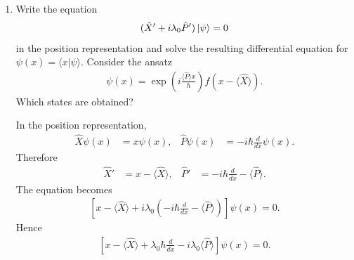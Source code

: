 \documentclass[11pt,a4paper]{scrartcl}
\begin{document}
\begin{enumerate}[label=(\alph*)]
    \item Write the equation
    \begin{align*}
        (\hat{X}' + i\lambda_0 \hat{P}')\ket{\psi} = 0
    \end{align*}
    in the position representation and solve the resulting differential equation for $\psi(x)=\langle x|\psi\rangle$. Consider the ansatz
    \begin{align*}
        \psi(x)=\exp\!\left(i\frac{\langle \hat{P}\rangle x}{\hbar}\right) f(x-\langle \hat{X}\rangle).
    \end{align*}
    Which states are obtained?
    \begin{calculationbox}
        In the position representation,
        \begin{align*}
            \hat{X}\psi(x) &= x\psi(x),
            &
            \hat{P}\psi(x) &= -i\hbar \frac{d}{dx}\psi(x).
        \end{align*}
        Therefore
        \begin{align*}
            \hat{X}' &= x - \langle \hat{X} \rangle,
            &
            \hat{P}' &= -i\hbar \frac{d}{dx} - \langle \hat{P} \rangle.
        \end{align*}
        The equation becomes
        \begin{align*}
            \left[
                x - \langle \hat{X} \rangle
                + i\lambda_0\left(-i\hbar\frac{d}{dx} - \langle \hat{P} \rangle\right)
            \right]\psi(x)=0.
        \end{align*}
        Hence
        \begin{align*}
            \left[
                x - \langle \hat{X} \rangle
                + \lambda_0 \hbar \frac{d}{dx}
                - i\lambda_0 \langle \hat{P} \rangle
            \right]\psi(x)=0.
        \end{align*}


\end{calculationbox}
\end{enumerate}
\end{document}
